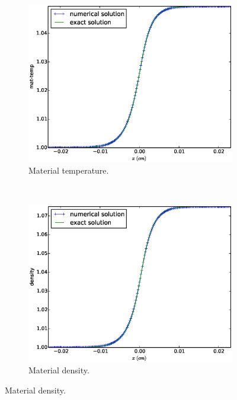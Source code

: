 \documentclass[times,doublespace]{fldauth}%
\begin{document}
%
%
\begin{figure}[H]
    \begin{subfigure}{0.5\textwidth}
    \centering
    \includegraphics[width=\linewidth]{figures/cst-xs/mach-1p05-mat-temp-plot.eps}
    \caption{Material temperature.}\label{fig:mach-1p05-cst-xs-temp}
    \end{subfigure}
    ~
    \begin{subfigure}{0.5\textwidth}
    \centering
    \includegraphics[width=\linewidth]{figures/cst-xs/mach-1p05-density-plot.eps}
    \caption{Material density.}\label{fig:mach-1p05-cst-xs-density}
    \end{subfigure}
    

\end{figure}
\end{document}
